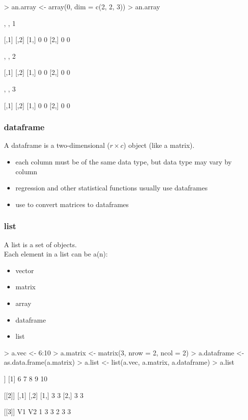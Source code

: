 \documentclass[handout]{beamer}
\newcommand{\red}{\color{red}}
\newcommand{\black}{\color{black}}
\begin{document}
\begin{frame}[fragile]
\footnotesize
\red
\begin{Schunk}
\begin{Sinput}
> an.array <- array(0, dim = c(2, 2, 3))
> an.array
\end{Sinput}
\begin{Soutput}
, , 1

     [,1] [,2]
[1,]    0    0
[2,]    0    0

, , 2

     [,1] [,2]
[1,]    0    0
[2,]    0    0

, , 3

     [,1] [,2]
[1,]    0    0
[2,]    0    0
\end{Soutput}
\end{Schunk}
\normalsize
\end{frame}

\begin{frame}
\frametitle{dataframe}
A dataframe is a two-dimensional ($r \times c$) object (like a matrix).
\pause
\begin{itemize}
\item each column must be of the same data type, but data type may vary by column
\pause
\item regression and other statistical functions usually use dataframes
\pause
\item use \red{\tt as.data.frame()} \black to convert matrices to dataframes 
\end{itemize}
\end{frame}

\begin{frame}
\frametitle{list}
A list is a set of objects.\\
\pause
\bigskip
Each element in a list can be a(n):
\begin{itemize}
\item vector
\item matrix
\item array
\item dataframe
\item list
\end{itemize}
\end{frame}

\begin{frame}[fragile]
\red
\footnotesize
\begin{Schunk}
\begin{Sinput}
> a.vec <- 6:10
> a.matrix <- matrix(3, nrow = 2, ncol = 2)
> a.dataframe <- as.data.frame(a.matrix)
> a.list <- list(a.vec, a.matrix, a.dataframe)
> a.list
\end{Sinput}
\begin{Soutput}
[[1]]
[1]  6  7  8  9 10

[[2]]
     [,1] [,2]
[1,]    3    3
[2,]    3    3

[[3]]
  V1 V2
1  3  3
2  3  3
\end{Soutput}
\end{Schunk}
\black
\normalsize
\end{frame}
\end{document}
